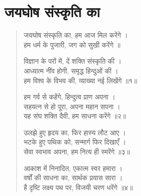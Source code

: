 \section{जयघोष संस्कृति का}
\label{sec:jai-ghosh-sanskriti-ka}

\begin{verse}

जयघोष संस्कृति का, हम आज मिल करेंगे ।\\
हम धर्म के पुजारी, जग को सुखी करेंगे ॥

विज्ञान के परों में, दें शक्ति संस्कृति की ।\\
आध्यात्म नींव होगी, समृद्ध हिन्दुओं की ।\\
हम विश्व के विभव की, व्याख्या नई लिखेंगे ॥१॥

हम गर्व से कहेंगे, हिन्दुत्व प्राण अपना ।\\
सहयत्न से हो पूरा, अपना महान सपना ।\\
यह संघ शक्ति दैवी, हम साधना करेंगे ॥२॥

उलझे हुए हृदय का, फिर हास्य लौट आए ।\\
भटके हुए पथिक को, सन्मार्ग फिर दिखाएँ ।\\
सेवा स्वभाव अपना, हम नित्य ही स्मरेंगे ॥३॥

आकाश में निनादित, एकात्म स्वर हमारा ।\\
वर्षों की साधना का, सार्थक प्रयास सारा ।\\
है दृष्टि लक्ष्य पथ पर, विजयी चरण धरेंगे ॥४॥

\end{verse}

